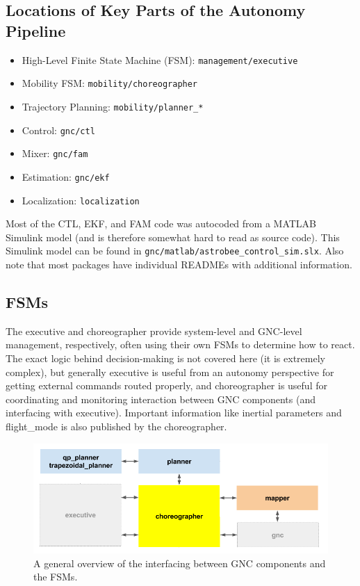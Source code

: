\documentclass{article}
\begin{document}
\subsection{Locations of Key Parts of the Autonomy Pipeline}
\begin{itemize}
 	\item High-Level Finite State Machine (FSM): \texttt{management/executive}
	\item Mobility FSM: \texttt{mobility/choreographer}
    \item Trajectory Planning: \texttt{mobility/planner\_*}
    \item Control: \texttt{gnc/ctl}
    \item Mixer: \texttt{gnc/fam}
    \item Estimation:  \texttt{gnc/ekf}
    \item Localization: \texttt{localization}
\end{itemize}

Most of the CTL, EKF, and FAM code was autocoded from a MATLAB Simulink model (and is therefore somewhat hard to read as source code). This Simulink model can be found in \texttt{gnc/matlab/astrobee\_control\_sim.slx}. Also note that most packages have individual READMEs with additional information.

\subsection{FSMs}

The executive and choreographer provide system-level and GNC-level management, respectively, often using their own FSMs to determine how to react. The exact logic behind decision-making is not covered here (it is extremely complex), but generally executive is useful from an autonomy perspective for getting external commands routed properly, and choreographer is useful for coordinating and monitoring interaction between GNC components (and interfacing with executive). Important information like inertial parameters and flight\_mode is also published by the choreographer.

\begin{figure}[h!]
	\centering
	\includegraphics[width=1.0\textwidth]{img/mob_overview.png}
	\caption{A general overview of the interfacing between GNC components and the FSMs.}
\end{figure}
\end{document}
